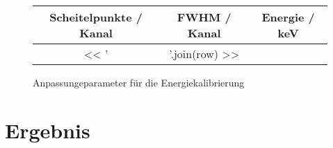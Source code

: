 \documentclass[11pt, ngerman, fleqn, DIV=15, headinclude, BCOR=2cm]{scrreprt}
\begin{document}
\begin{figure}
	\centering
	\begin{tabular}{SSS}
		{Scheitelpunkte / Kanal} &
		{FWHM / Kanal} &
		{Energie / \si{\kilo\electronvolt}}\\
		\midrule
		<< ' & '.join(row) >> \\
	\end{tabular}
	\caption{%
		Anpassungeparameter für die Energiekalibrierung
	}
	\label{tab:energiekalibrierung}
\end{figure}



\chapter{Ergebnis}



\end{document}
